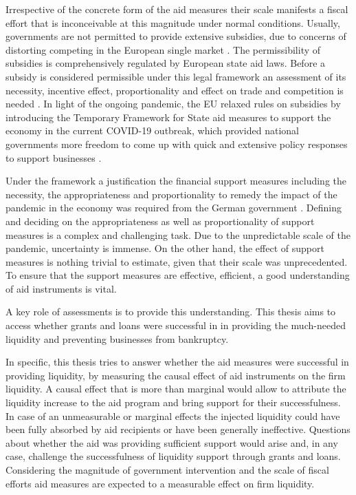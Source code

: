 Irrespective of the concrete form of the aid measures their scale manifests a fiscal effort that is inconceivable at this magnitude under normal conditions. Usually, governments are not permitted to provide extensive subsidies, due to concerns of distorting competing in the European single market \parencite{claici_european_2022}. The permissibility of subsidies is comprehensively regulated by European state aid laws. Before a subsidy is considered permissible under this legal framework an assessment of its necessity, incentive effect, proportionality and effect on trade and competition is needed \parencite{claici_european_2022}. In light of the ongoing pandemic, the EU relaxed rules on subsidies by introducing the Temporary Framework for State aid measures to support the economy in the current COVID-19 outbreak, which provided national governments more freedom to come up with quick and extensive policy responses to support businesses \parencite{eu_com_temporary_2020}.

Under the framework a justification the financial support measures including the necessity, the appropriateness and proportionality to remedy the impact of the pandemic in the economy was required from the German government \parencite{eu_com_temporary_2020}. Defining and deciding on the appropriateness as well as proportionality of support measures is a complex and challenging task. Due to the unpredictable scale of the pandemic, uncertainty is immense. On the other hand, the effect of support measures is nothing trivial to estimate, given that their scale was unprecedented. To ensure that the support measures are effective, efficient, a good understanding of aid instruments is vital. 

A key role of assessments is to provide this understanding. This thesis aims to access whether grants and loans were successful in in providing the much-needed liquidity and preventing businesses from bankruptcy.

In specific, this thesis tries to answer whether the aid measures were successful in providing liquidity, by measuring the causal effect of aid instruments on the firm liquidity. A causal effect that is more than marginal would allow to attribute the liquidity increase to the aid program and bring support for their successfulness. In case of an unmeasurable or marginal effects the injected liquidity could have been fully absorbed by aid recipients or have been generally ineffective. Questions about whether the aid was providing sufficient support 
would arise and, in any case, challenge the successfulness of liquidity support through grants and loans. Considering the magnitude of government intervention and the scale of fiscal efforts aid measures are expected to a measurable effect on firm liquidity.

